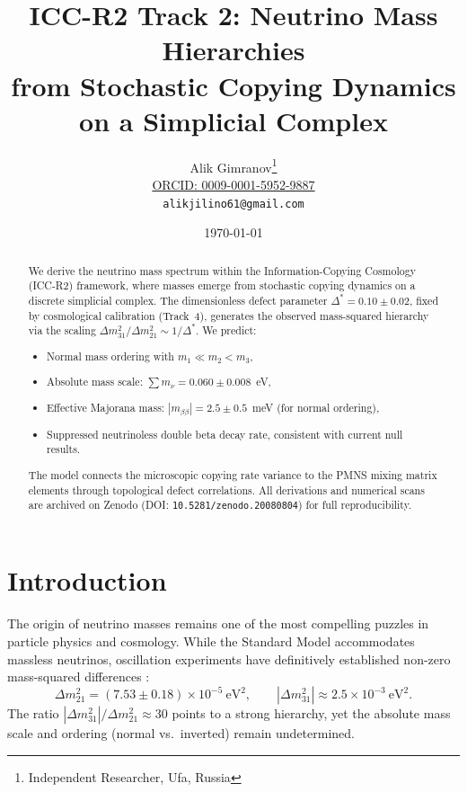 \documentclass[11pt,a4paper]{article}
\title{
    \textbf{ICC-R2 Track 2: Neutrino Mass Hierarchies} \\
    \large from Stochastic Copying Dynamics on a Simplicial Complex
}
\author{
    Alik Gimranov\thanks{Independent Researcher, Ufa, Russia} \\
    \href{https://orcid.org/0009-0001-5952-9887}{ORCID: 0009-0001-5952-9887} \\
    \texttt{alikjilino61@gmail.com}
}
\date{\today}
\newcommand{\DeltaStar}{\Delta^{\ast}}
\newcommand{\zenodoDOITrackTwo}{10.5281/zenodo.20080804} %
\begin{document}
\maketitle

\begin{abstract}
\noindent
We derive the neutrino mass spectrum within the Information-Copying Cosmology (ICC-R2) framework, where masses emerge from stochastic copying dynamics on a discrete simplicial complex. The dimensionless defect parameter $\DeltaStar = 0.10 \pm 0.02$, fixed by cosmological calibration (Track~4), generates the observed mass-squared hierarchy via the scaling $\Delta m^2_{31}/\Delta m^2_{21} \sim 1/\DeltaStar$. We predict:
\begin{itemize}
    \item Normal mass ordering with $m_1 \ll m_2 < m_3$,
    \item Absolute mass scale: $\sum m_\nu = 0.060 \pm 0.008$~eV,
    \item Effective Majorana mass: $|m_{\beta\beta}| = 2.5 \pm 0.5$~meV (for normal ordering),
    \item Suppressed neutrinoless double beta decay rate, consistent with current null results.
\end{itemize}
The model connects the microscopic copying rate variance to the PMNS mixing matrix elements through topological defect correlations. All derivations and numerical scans are archived on Zenodo (DOI: \texttt{\zenodoDOITrackTwo}) for full reproducibility.
\end{abstract}

\section{Introduction}
\label{sec:intro}

The origin of neutrino masses remains one of the most compelling puzzles in particle physics and cosmology. While the Standard Model accommodates massless neutrinos, oscillation experiments have definitively established non-zero mass-squared differences \cite{nufit2024}:
\begin{equation}
\Delta m^2_{21} = (7.53 \pm 0.18) \times 10^{-5}~\text{eV}^2, \qquad
|\Delta m^2_{31}| \approx 2.5 \times 10^{-3}~\text{eV}^2.
\end{equation}
The ratio $|\Delta m^2_{31}|/\Delta m^2_{21} \approx 30$ points to a strong hierarchy, yet the absolute mass scale and ordering (normal vs.\ inverted) remain undetermined.
\end{document}
